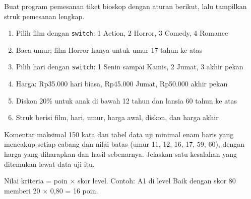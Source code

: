 \documentclass[a4paper]{article}
\begin{document}
Buat program pemesanan tiket bioskop dengan aturan berikut, lalu tampilkan struk pemesanan lengkap.
\begin{enumerate}
\item Pilih film dengan \texttt{switch}: 1 Action, 2 Horror, 3 Comedy, 4 Romance
\item Baca umur; film Horror hanya untuk umur 17 tahun ke atas
\item Pilih hari dengan \texttt{switch}: 1 Senin sampai Kamis, 2 Jumat, 3 akhir pekan
\item Harga: Rp35.000 hari biasa, Rp45.000 Jumat, Rp50.000 akhir pekan
\item Diskon 20\% untuk anak di bawah 12 tahun dan lansia 60 tahun ke atas
\item Struk berisi film, hari, umur, harga awal, diskon, dan harga akhir
\end{enumerate}
Komentar maksimal 150 kata dan tabel data uji minimal enam baris yang mencakup setiap cabang dan nilai batas (umur 11, 12, 16, 17, 59, 60), dengan harga yang diharapkan dan hasil sebenarnya. Jelaskan satu kesalahan yang ditemukan lewat data uji itu.

\par\vspace{4pt}\par\vspace{6pt}
Nilai kriteria = poin × skor level. Contoh: A1 di level Baik dengan skor 80 memberi 20 × 0,80 = 16 poin.
\end{document}
